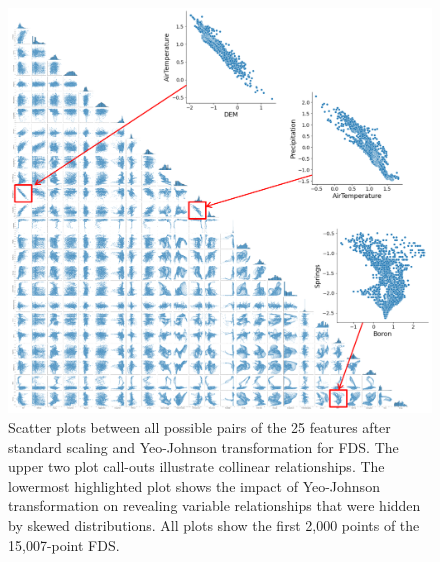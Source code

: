 \begin{figure}[!htp]
\centering
\includegraphics[width=\textwidth]{templates/images/Figure-Scatterplot_Scaled_Features.png}
\caption[Scaled FDS scatter plots]{Scatter plots between all possible pairs of the 25 features after standard scaling and Yeo-Johnson transformation for FDS. The upper two plot call-outs illustrate collinear relationships. The lowermost highlighted plot shows the impact of Yeo-Johnson transformation on revealing variable relationships that were hidden by skewed distributions. All plots show the first 2,000 points of the 15,007-point FDS.}
\label{fig:scaled_scatter}
\end{figure}


